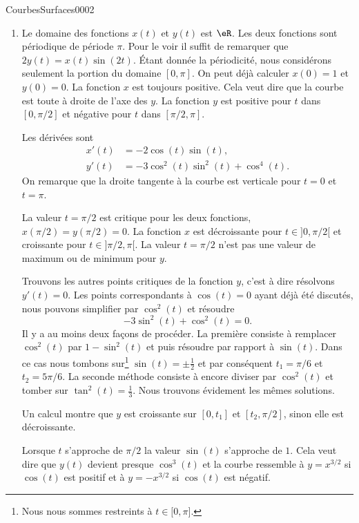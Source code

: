 \begin{corrige}{CourbesSurfaces0002}
\begin{enumerate}
\item \label{Itemzzdexoii}
    Le domaine des fonctions $x(t)$ et $y(t)$ est $\eR$. Les deux fonctions sont  périodique de période $\pi$.  Pour le voir il suffit de remarquer que $2y(t)= x(t)\sin(2t)$. Étant donnée la périodicité,  nous considérons seulement la portion du domaine $[0,\pi]$. On peut déjà calculer $x(0)=1$ et $y(0)=0$. La fonction $x$ est toujours positive. Cela veut dire que la courbe est toute à droite de l'axe des $y$. La fonction $y$ est positive pour $t$ dans $[0,\pi/2]$ et négative pour $t$ dans $[\pi/2, \pi]$.

  Les dérivées sont 
  \begin{equation}
      \begin{aligned}
        x'(t)&= -2\cos(t)\sin(t),\\
        y'(t)&= -3\cos^2(t)\sin^2(t)+ \cos^4(t).
      \end{aligned}
    \end{equation}
On remarque que la droite tangente à la courbe est verticale pour $t=0$ et $t=\pi$.
 
La valeur $t=\pi/2$ est critique pour les deux fonctions, $x(\pi/2)=y(\pi/2)=0$. La fonction $x$ est décroissante pour $t\in ]0,\pi/2[$ et croissante pour $t\in]\pi/2, \pi [$. La valeur $t=\pi/2$ n'est pas une valeur de maximum ou de minimum pour $y$.

Trouvons les autres points critiques de la fonction \( y\), c'est à dire résolvons \( y'(t)=0\). Les points correspondants à \( \cos(t)=0\) ayant déjà été discutés, nous pouvons simplifier par \( \cos^2(t)\) et résoudre
\begin{equation}
    -3\sin^2(t)+\cos^2(t)=0.
\end{equation}
Il y a au moins deux façons de procéder. La première consiste à remplacer \( \cos^2(t)\) par \( 1-\sin^2(t)\) et puis résoudre par rapport à \( \sin(t)\). Dans ce cas nous tombons sur\footnote{Nous nous sommes restreints à \( t\in\mathopen[ 0 , \pi \mathclose]\).} \( \sin(t)=\pm\frac{1}{ 2 }\) et par conséquent \( t_1=\pi/6\) et \( t_2=5\pi/6\). La seconde méthode consiste à encore diviser par \( \cos^2(t)\) et tomber sur \( \tan^2(t)=\frac{1}{ 3 }\). Nous trouvons évidement les mêmes solutions.

Un calcul montre que $y$ est croissante sur  $[0, t_1]$ et $[t_2,\pi/2]$, sinon elle est décroissante.

    Lorsque $t$ s'approche de $\pi/2$ la valeur $\sin(t)$ s'approche de $1$. Cela veut dire que $y(t)$ devient presque $\cos^3(t)$ et la courbe ressemble à $y=x^{3/2}$ si $\cos(t)$ est positif et à  $y=-x^{3/2}$ si $\cos(t)$ est négatif.  


\end{enumerate}
\end{corrige}

